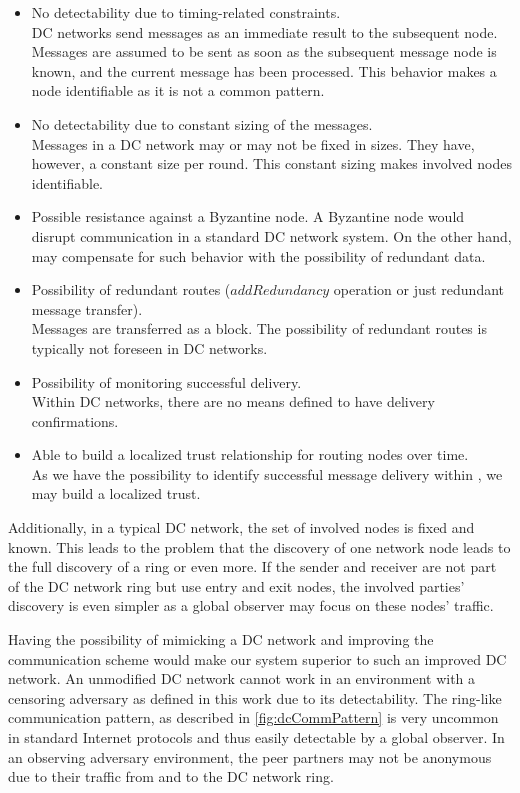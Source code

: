 \begin{itemize}
	\item No detectability due to timing-related constraints.\\
	DC networks send messages as an immediate result to the subsequent node. Messages are assumed to be sent as soon as the subsequent message node is known, and the current message has been processed. This behavior makes a node identifiable as it is not a common pattern.
	\item No detectability due to constant sizing of the messages.\\
	Messages in a DC network may or may not be fixed in sizes. They have, however, a constant size per round. This constant sizing makes involved nodes identifiable.
	\item Possible resistance against a Byzantine node.
	A Byzantine node would disrupt communication in a standard DC network system. On the other hand, \MessageVortex{} may compensate for such behavior with the possibility of redundant data.
	\item Possibility of redundant routes ($addRedundancy$ operation or just redundant message transfer).\\
	Messages are transferred as a block. The possibility of redundant routes is typically not foreseen in DC networks.
	\item Possibility of monitoring successful delivery.\\
	Within DC networks, there are no means defined to have delivery confirmations.
	\item Able to build a localized trust relationship for routing nodes over time.\\
	As we have the possibility to identify successful message delivery within \MessageVortex{}, we may build a localized trust.
\end{itemize}

Additionally, in a typical DC network, the set of involved nodes is fixed and known. This leads to the problem that the discovery of one network node leads to the full discovery of a ring or even more. If the sender and receiver are not part of the DC network ring but use entry and exit nodes, the involved parties' discovery is even simpler as a global observer may focus on these nodes' traffic. 

Having the possibility of mimicking a DC network and improving the communication scheme would make our system superior to such an improved DC network. An unmodified DC network cannot work in an environment with a censoring adversary as defined in this work due to its detectability. The ring-like communication pattern, as described in \cref{fig:dcCommPattern} is very uncommon in standard Internet protocols and thus easily detectable by a global observer. In an observing adversary environment, the peer partners may not be anonymous due to their traffic from and to the DC network ring.

